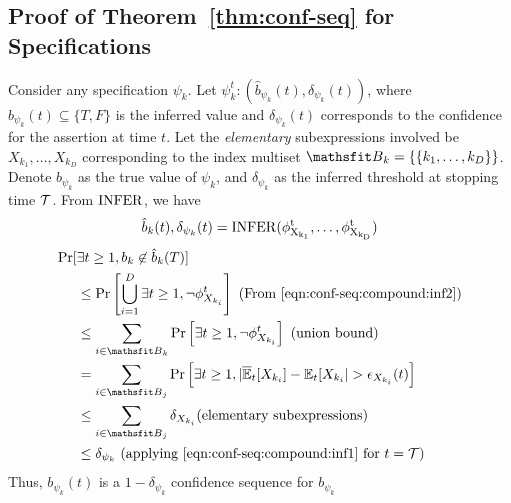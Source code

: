 \begin{subappendices}
\subsection{Proof of Theorem~\ref{thm:conf-seq} for Specifications}
\label{sec:thm:conf-seq:proof:contd}


Consider any specification $\psi_k$. Let $\psi_k^t : (\hat{b}_{\psi_k}(t), \delta_{\psi_k}(t))$,
where $\hat{b}_{\psi_k}(t) \subseteq \{T, F\}$ is the inferred value and $\delta_{\psi_k}(t)$ corresponds to the confidence for the assertion at time $t$. 
Let the \textit{elementary} subexpressions involved be $X_{k_1}, \dots, X_{k_D}$ corresponding to the index multiset $\etB_k = \{\{k_1, \dots, k_D \}\}$.
Denote $b_{\psi_k}$ as the true value of $\psi_k$, and $\delta_{\psi_k}$ as the inferred threshold at stopping time ${\mathcal{T}}$.
From $\rm{INFER}$, we have
\begin{equation}
\hat{b}_k(t), \delta_{\psi_k}(t) = \rm{INFER}(\phi^t_{X_{k_1}}, \dots, \phi^t_{X_{k_D}})
\label{eqn:conf-seq:compound:inf2}
\end{equation}
\begin{align*}
     \Pr[&\exists t \geq 1, b_k \not\in \hat{b}_k(T)]\\
        &\leq \Pr\left[\bigcup\limits_{i = 1}^{D} \exists t \geq 1,  \neg \phi_{X_{k_i}}^t \right]  \text{ (From \ref{eqn:conf-seq:compound:inf2})} \\
      &\leq \sum\limits_{i\in \etB_k}\Pr\left[\exists t \geq 1, \neg \phi^t_{X_{k_i}}\right]  \text{ (union bound)} \\
      &= \sum\limits_{i\in \etB_j}\Pr\left[\exists t \geq 1, |\BarE_t[X_{k_i}] - \E_t[X_{k_i}| > \epsilon_{X_{k_i}}(t)\right]  \\
      &\leq \sum\limits_{i\in \etB_j} \delta_{X_{k_i}} \text{(elementary subexpressions)} \\
      &\leq \delta_{\psi_k}  \text{ (applying \ref{eqn:conf-seq:compound:inf1} for $t = \gT$)}
\end{align*}
Thus, $b_{\psi_k}(t)$ is a $1-\delta_{\psi_k}$ confidence sequence for $b_{\psi_k}$




\end{subappendices}
